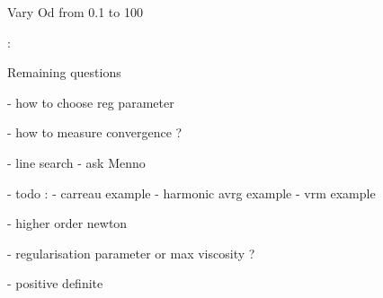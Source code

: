 Vary Od from 0.1 to 100 




\newpage

\Literature: \textcite{russ20} \textcite{spmw16}

Remaining questions

- how to choose reg parameter

- how to measure convergence ?

- line search - ask Menno

- todo : 
  - carreau example
  - harmonic avrg example
  - vrm example

- higher order newton

- regularisation parameter or max viscosity ?

- positive definite

